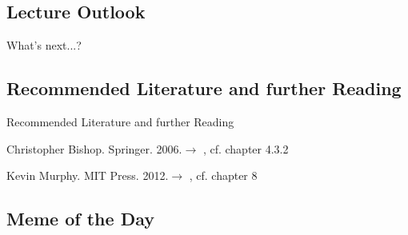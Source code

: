 \subsection{Lecture Outlook}

\begin{frame}{What's next...?}{}
\end{frame}


\subsection{Recommended Literature and further Reading}

\begin{frame}[allowframebreaks]{Recommended Literature and further Reading}{}
	\footnotesize
	\begin{thebibliography}{2}
			{Christopher Bishop. Springer. 2006.}{$\rightarrow$ \href{
				http://users.isr.ist.utl.pt/~wurmd/Livros/school/Bishop\%20-\%20Pattern\%20Recognition\%20And\%20Machine\%20Learning\%20-\%20Springer\%20\%202006.pdf
			}{}, cf. chapter 4.3.2}

			{Kevin Murphy. MIT Press. 2012.}{$\rightarrow$ \href{
				https://doc.lagout.org/science/Artificial\%20Intelligence/Machine\%20learning/Machine\%20Learning_\%20A\%20Probabilistic\%20Perspective\%20\%5BMurphy\%202012-08-24\%5D.pdf
			}{}, cf. chapter 8}
	\end{thebibliography}
\end{frame}


\subsection{Meme of the Day}

